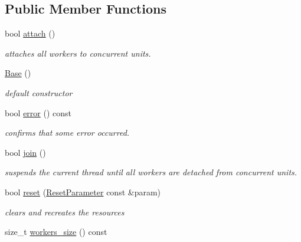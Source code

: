 \subsection*{Public Member Functions}
\begin{DoxyCompactItemize}
\item 
bool \hyperlink{classhryky_1_1task_1_1distributor_1_1_base_ae17d5723d8aa5567ea6a47b67f8133c4}{attach} ()
\begin{DoxyCompactList}\small\item\em attaches all workers to concurrent units. \end{DoxyCompactList}\item 
\hyperlink{classhryky_1_1task_1_1distributor_1_1_base_a5ffe0568374d8b9b4c4ec32953fd6453}{Base} ()
\begin{DoxyCompactList}\small\item\em default constructor \end{DoxyCompactList}\item 
\hypertarget{classhryky_1_1task_1_1distributor_1_1_base_acd23149eb623c0e2e9c90cf0f1d6f87b}{bool \hyperlink{classhryky_1_1task_1_1distributor_1_1_base_acd23149eb623c0e2e9c90cf0f1d6f87b}{error} () const }\label{classhryky_1_1task_1_1distributor_1_1_base_acd23149eb623c0e2e9c90cf0f1d6f87b}

\begin{DoxyCompactList}\small\item\em confirms that some error occurred. \end{DoxyCompactList}\item 
bool \hyperlink{classhryky_1_1task_1_1distributor_1_1_base_a15a4600d30363d1393a68ec3d1ec415e}{join} ()
\begin{DoxyCompactList}\small\item\em suspends the current thread until all workers are detached from concurrent units. \end{DoxyCompactList}\item 
bool \hyperlink{classhryky_1_1task_1_1distributor_1_1_base_a2dfa3093b3165d58ed31aa575ae1b159}{reset} (\hyperlink{structhryky_1_1task_1_1distributor_1_1_base_1_1_reset_parameter}{Reset\-Parameter} const \&param)
\begin{DoxyCompactList}\small\item\em clears and recreates the resources \end{DoxyCompactList}\item 
\hypertarget{classhryky_1_1task_1_1distributor_1_1_base_adfb7b94cdf47e1bdd4f1775bb3264602}{size\-\_\-t \hyperlink{classhryky_1_1task_1_1distributor_1_1_base_adfb7b94cdf47e1bdd4f1775bb3264602}{workers\-\_\-size} () const }\label{classhryky_1_1task_1_1distributor_1_1_base_adfb7b94cdf47e1bdd4f1775bb3264602}


\end{DoxyCompactItemize}
